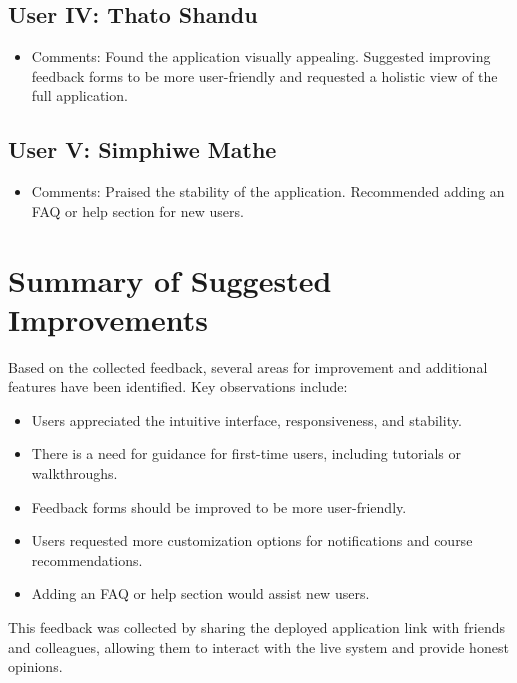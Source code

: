 \subsection*{User IV: Thato Shandu}
\begin{itemize}
    \item Comments: Found the application visually appealing. Suggested improving feedback forms to be more user-friendly and requested a holistic view of the full application.
\end{itemize}

\subsection*{User V: Simphiwe Mathe}
\begin{itemize}
    \item Comments: Praised the stability of the application. Recommended adding an FAQ or help section for new users.
\end{itemize}

\section{Summary of Suggested Improvements}
Based on the collected feedback, several areas for improvement and additional features have been identified. Key observations include:

\begin{itemize}
    \item Users appreciated the intuitive interface, responsiveness, and stability.
    \item There is a need for guidance for first-time users, including tutorials or walkthroughs.
    \item Feedback forms should be improved to be more user-friendly.
    \item Users requested more customization options for notifications and course recommendations.
    \item Adding an FAQ or help section would assist new users.
\end{itemize}

This feedback was collected by sharing the deployed application link with friends and colleagues, allowing them to interact with the live system and provide honest opinions.

